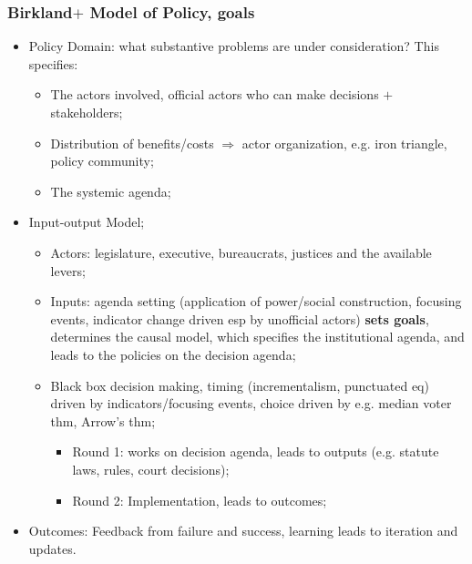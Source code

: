 \documentclass[aspectratio=169]{beamer}
\theoremstyle{principle}
\begin{document}
\begin{frame}
\frametitle{Birkland$+$ Model of Policy, goals}
\begin{itemize}
\item Policy Domain: what substantive problems are under consideration?  This specifies:
\begin{itemize}
\item The actors involved, official actors who can make decisions $+$ stakeholders; 
\item Distribution of benefits/costs $\Rightarrow$ actor organization, e.g. iron triangle, policy community;
\item The systemic agenda; 
\end{itemize}
\bigskip
\item \color{black}Input-output Model;
\begin{itemize}
\item Actors: legislature, executive, bureaucrats, justices and the available levers;
\item Inputs: agenda setting (application of power/social construction, focusing events, indicator change driven esp by unofficial actors) \textbf{sets goals}, determines the causal model, which specifies the institutional agenda, and leads to the policies on the decision agenda;
\item Black box decision making, timing (incrementalism, punctuated eq) driven by indicators/focusing events, choice driven by e.g. median voter thm, Arrow's thm;
\begin{itemize}
\item Round 1: works on decision agenda, leads to outputs (e.g. statute laws, rules, court decisions);
\item Round 2: Implementation, leads to outcomes;
 \end{itemize}
\end{itemize}
\bigskip
\item Outcomes: Feedback from failure and success, learning leads to iteration and updates.
\end{itemize}
\end{frame}
\end{document}
